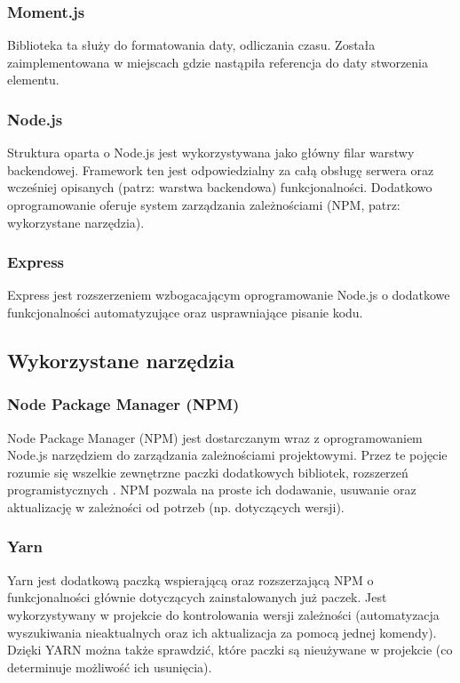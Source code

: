\documentclass[eng,printmode]{mgr}
\begin{document}
\subsubsection{Moment.js}
Biblioteka ta \cite {Moment} służy do formatowania daty, odliczania czasu. Została zaimplementowana w miejscach gdzie nastąpiła referencja do daty stworzenia elementu.

\subsubsection{Node.js}
Struktura oparta o Node.js \cite {Node.js} jest wykorzystywana jako główny filar warstwy backendowej. Framework ten jest odpowiedzialny za całą obsługę serwera oraz wcześniej opisanych (patrz: warstwa backendowa) funkcjonalności. Dodatkowo oprogramowanie oferuje system zarządzania zależnościami (NPM, patrz: wykorzystane narzędzia).

\subsubsection{Express}
Express \cite {Express} jest rozszerzeniem wzbogacającym oprogramowanie Node.js o dodatkowe funkcjonalności automatyzujące oraz usprawniające pisanie kodu.
\subsection{Wykorzystane narzędzia}

\subsubsection{Node Package Manager (NPM)}
Node Package Manager (NPM) \cite {NPM} jest dostarczanym wraz z oprogramowaniem Node.js narzędziem do zarządzania zależnościami projektowymi. Przez te pojęcie rozumie się wszelkie zewnętrzne paczki dodatkowych bibliotek, rozszerzeń programistycznych . NPM pozwala na proste ich dodawanie, usuwanie oraz aktualizację w zależności od potrzeb (np. dotyczących wersji).

\subsubsection{Yarn}
Yarn \cite {YARN} jest dodatkową paczką wspierającą oraz rozszerzającą NPM o funkcjonalności głównie dotyczących  zainstalowanych już paczek. Jest wykorzystywany w projekcie do kontrolowania wersji zależności (automatyzacja wyszukiwania nieaktualnych oraz ich aktualizacja za pomocą jednej komendy). Dzięki YARN można także sprawdzić, które paczki są nieużywane w projekcie (co determinuje możliwość ich usunięcia).
\end{document}
